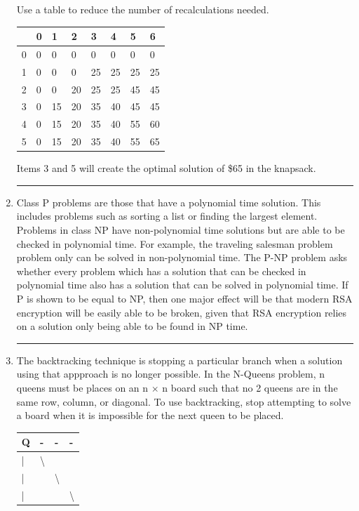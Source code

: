 \documentclass{article}
\begin{document}
\begin{enumerate}
Use a table to reduce the number of recalculations needed.

\begin{table}[H]
\begin{tabular}{|l|l|l|l|l|l|l|l|}
\hline
 & 0 & 1 & 2 & 3 & 4 & 5 & 6 \\ \hline
0 & 0 & 0 & 0 & 0 & 0 & 0 & 0 \\ \hline
1 & 0 & 0 & 0 & 25 & 25 & 25 & 25 \\ \hline
2 & 0 & 0 & 20 & 25 & 25 & 45 & 45 \\ \hline
3 & 0 & 15 & 20 & 35 & 40 & 45 & 45 \\ \hline
4 & 0 & 15 & 20 & 35 & 40 & 55 & 60 \\ \hline
5 & 0 & 15 & 20 & 35 & 40 & 55 & 65 \\ \hline
\end{tabular}
\end{table}

Items 3 and 5 will create the optimal solution of \$65 in the knapsack. 

\noindent\rule{8cm}{0.4pt}

\item Class P problems are those that have a polynomial time solution. This includes problems such as sorting a list or finding the largest element. Problems in class NP have non-polynomial time solutions but are able to be checked in polynomial time. For example, the traveling salesman problem problem only can be solved in non-polynomial time. The P-NP problem asks whether every problem which has a solution that can be checked in polynomial time also has a solution that can be solved in polynomial time. If P is shown to be equal to NP, then one major effect will be that modern RSA encryption will be easily able to be broken, given that RSA encryption relies on a solution only being able to be found in NP time. 

\noindent\rule{8cm}{0.4pt}


\item 

    The backtracking technique is stopping a particular branch when a solution using that appproach is no longer possible. In the N-Queens problem, n queens must be places on an n $\times$ n board such that no 2 queens are in the same row, column, or diagonal. To use backtracking, stop attempting to solve a board when it is impossible for the next queen to be placed. 

    \begin{table}[H]
        \begin{tabular}{|l|l|l|l|}
        \hline
        Q & - & - & - \\ \hline
        | & \textbackslash{} &  &  \\ \hline
        | &  & \textbackslash{} &  \\ \hline
        | &  &  & \textbackslash{} \\ \hline
        \end{tabular}
    \end{table}


\end{enumerate}
\end{document}
